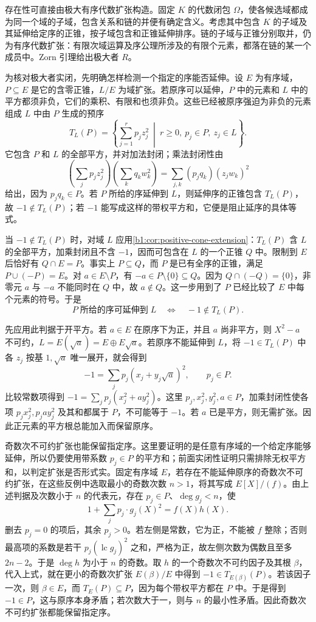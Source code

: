 \begin{proofsketch}
	存在性可直接由极大有序代数扩张构造。固定 \(K\) 的代数闭包 \(\Omega\)，使各候选域都成为同一个域的子域，包含关系和链的并便有确定含义。考虑其中包含 \(K\) 的子域及其延伸给定序的正锥，按子域包含和正锥延伸排序。链的子域与正锥分别取并，仍为有序代数扩张：有限次域运算及序公理所涉及的有限个元素，都落在链的某一个成员中。Zorn 引理给出极大者 \(R\)。

	为核对极大者实闭，先明确怎样检测一个指定的序能否延伸。设 \(E\) 为有序域，\(P\subseteq E\) 是它的含零正锥，\(L/E\) 为域扩张。若原序可以延伸，\(P\) 中的元素和 \(L\) 中的平方都须非负，它们的乘积、有限和也须非负。这些已经被原序强迫为非负的元素组成 \(L\) 中由 \(P\) 生成的预序
	\[
		T_L(P)=\left\{\sum_{j=1}^{r}p_jz_j^2\ \middle|\ r\geq0,\ p_j\in P,\ z_j\in L\right\}.
	\]
	它包含 \(P\) 和 \(L\) 的全部平方，并对加法封闭；乘法封闭性由
	\[
		\left(\sum_jp_jz_j^2\right)\left(\sum_kq_kw_k^2\right) =\sum_{j,k}(p_jq_k)(z_jw_k)^2
	\]
	给出，因为 \(p_jq_k\in P\)。若 \(P\) 所给的序延伸到 \(L\)，则延伸序的正锥包含 \(T_L(P)\)，故 \(-1\notin T_L(P)\)；若 \(-1\) 能写成这样的带权平方和，它便是阻止延序的具体等式。

	当 \(-1\notin T_L(P)\) 时，对域 \(L\) 应用\cref{b1:cor:positive-cone-extension}：\(T_L(P)\) 含 \(L\) 的全部平方，加乘封闭且不含 \(-1\)，因而可包含在 \(L\) 的一个正锥 \(Q\) 中。限制到 \(E\) 后恰好有 \(Q\cap E=P\)。事实上 \(P\subseteq Q\)，而 \(P\) 是已有全序的正锥，满足 \(P\cup(-P)=E\)。对 \(a\in E\setminus P\)，有 \(-a\in P\setminus\{0\}\subseteq Q\)。因为 \(Q\cap(-Q)=\{0\}\)，非零元 \(a\) 与 \(-a\) 不能同时在 \(Q\) 中，故 \(a\notin Q\)。这一步用到了 \(P\) 已经比较了 \(E\) 中每个元素的符号。于是
	\[
		P\;\text{所给的序可延伸到}\;L\quad\Longleftrightarrow\quad -1\notin T_L(P).
	\]

	先应用此判据于开平方。若 \(a\in E\) 在原序下为正，并且 \(a\) 尚非平方，则 \(X^2-a\) 不可约，\(L=E(\sqrt a)=E\oplus E\sqrt a\)。若原序不能延伸到 \(L\)，将 \(-1\in T_L(P)\) 中各 \(z_j\) 按基 \(1,\sqrt a\) 唯一展开，就会得到
	\[
		-1=\sum_jp_j(x_j+y_j\sqrt a)^2,\qquad p_j\in P.
	\]
	比较常数项得到 \(-1=\sum_jp_j(x_j^2+ay_j^2)\)。这里 \(p_j,x_j^2,y_j^2,a\in P\)，加乘封闭性使各项 \(p_jx_j^2,p_jay_j^2\) 及其和都属于 \(P\)，不可能等于 \(-1\)。若 \(a\) 已是平方，则无需扩张。因此正元素的平方根总能加入而保留原序。

	奇数次不可约扩张也能保留指定序。这里要证明的是任意有序域的一个给定序能够延伸，所以仍要使用带系数 \(p_j\in P\) 的平方和；前面实闭性证明只需排除无权平方和，以判定扩张是否形式实。固定有序域 \(E\)，若存在不能延伸原序的奇数次不可约扩张，在这些反例中选取最小的奇数次数 \(n>1\)，将其写成 \(E[X]/(f)\)。由上述判据及次数小于 \(n\) 的代表元，存在 \(p_j\in P\)、\(\deg g_j<n\)，使
	\[
		1+\sum_jp_j\cdot g_j(X)^2=f(X)h(X).
	\]
	删去 \(p_j=0\) 的项后，其余 \(p_j>0\)。若左侧是常数，它为正，不能被 \(f\) 整除；否则最高项的系数是若干 \(p_j(\operatorname{lc}g_j)^2\) 之和，严格为正，故左侧次数为偶数且至多 \(2n-2\)。于是 \(\deg h\) 为小于 \(n\) 的奇数。取 \(h\) 的一个奇数次不可约因子及其根 \(\beta\)，代入上式，就在更小的奇数次扩张 \(E(\beta)/E\) 中得到 \(-1\in T_{E(\beta)}(P)\)。若该因子一次，则 \(\beta\in E\)，而 \(T_E(P)\subseteq P\)，因为每个带权平方都在 \(P\) 中。于是得到 \(-1\in P\)，这与原序本身矛盾；若次数大于一，则与 \(n\) 的最小性矛盾。因此奇数次不可约扩张都能保留指定序。


\end{proofsketch}

